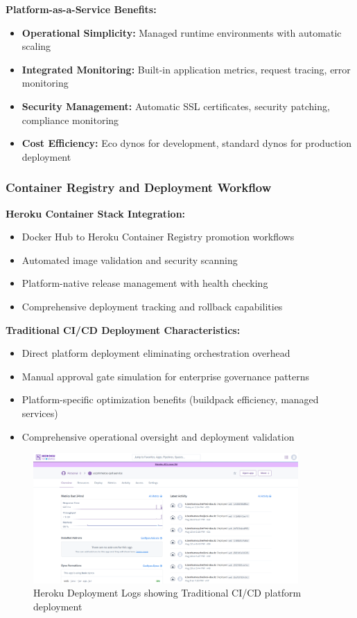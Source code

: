 \textbf{Platform-as-a-Service Benefits:}
\begin{itemize}
\item \textbf{Operational Simplicity:} Managed runtime environments with automatic scaling
\item \textbf{Integrated Monitoring:} Built-in application metrics, request tracing, error monitoring
\item \textbf{Security Management:} Automatic SSL certificates, security patching, compliance monitoring
\item \textbf{Cost Efficiency:} Eco dynos for development, standard dynos for production deployment
\end{itemize}

\subsubsection{Container Registry and Deployment Workflow}

\textbf{Heroku Container Stack Integration:}
\begin{itemize}
\item Docker Hub to Heroku Container Registry promotion workflows
\item Automated image validation and security scanning
\item Platform-native release management with health checking
\item Comprehensive deployment tracking and rollback capabilities
\end{itemize}

\textbf{Traditional CI/CD Deployment Characteristics:}
\begin{itemize}
\item Direct platform deployment eliminating orchestration overhead
\item Manual approval gate simulation for enterprise governance patterns
\item Platform-specific optimization benefits (buildpack efficiency, managed services)
\item Comprehensive operational oversight and deployment validation
\end{itemize}

\begin{figure}[H]
\centering
\includegraphics[width=0.9\textwidth]{figures/chapter5/heroku-deployment-logs.png}
\caption{Heroku Deployment Logs showing Traditional CI/CD platform deployment}
\label{fig:heroku-deployment-logs}
\end{figure}

